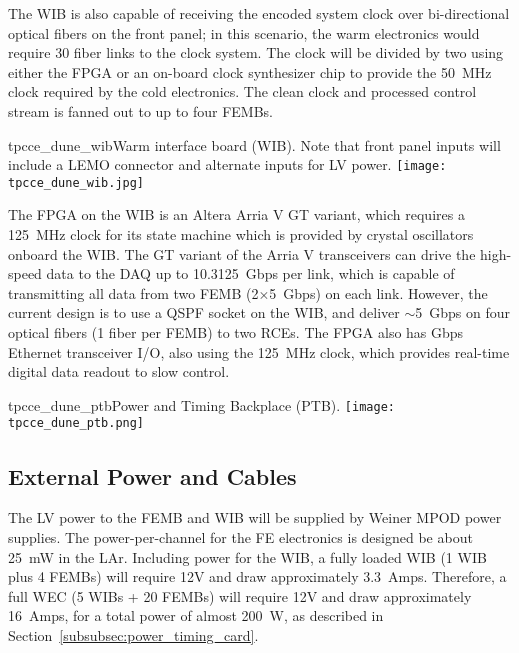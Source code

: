 The WIB is also capable of
receiving the encoded system clock over bi-directional optical
fibers on the front panel; in this scenario, the warm electronics would require 
30 fiber links to the clock system. The clock will be divided by two using either
the FPGA or an on-board clock synthesizer chip to provide the 50~MHz
clock required by the cold electronics.  The clean clock and processed
control stream is fanned out to up to four FEMBs.

\begin{cdrfigure}{tpcce_dune_wib}{Warm interface board (WIB). Note 
that front panel inputs will include a LEMO connector and alternate inputs for LV power.}
\texttt{[image: tpcce\_dune\_wib.jpg]}
\end{cdrfigure}

The FPGA on the WIB is an Altera Arria V GT variant, which requires a
125~MHz clock for its state machine which is provided by crystal
oscillators onboard the WIB. The GT variant of the Arria V
transceivers can drive the high-speed data to the DAQ up to
10.3125~Gbps per link, which is capable of transmitting all data from
two FEMB (2$\times$5~Gbps) on each link. However, the current design is to
use a QSPF socket on the WIB, and deliver $\sim$5~Gbps on four optical fibers 
(1 fiber per FEMB) to two RCEs. The FPGA also has Gbps Ethernet
transceiver I/O, also using the 125~MHz clock, which provides
real-time digital data readout to slow control.

\begin{cdrfigure}{tpcce_dune_ptb}{Power and Timing Backplace (PTB).}
\texttt{[image: tpcce\_dune\_ptb.png]}
\end{cdrfigure}


%
\subsection{External Power and Cables}
\label{subsec:ce_feedthrough_power}

The LV power to the FEMB and WIB will be supplied by Weiner MPOD power supplies. 
The power-per-channel for the FE electronics is designed be about 25~mW in the LAr.
Including power for the WIB, a fully loaded WIB (1 WIB plus 4 FEMBs) will require
12V and draw approximately 3.3~Amps. Therefore, a full WEC (5 WIBs + 20 FEMBs) will
require 12V and draw approximately 16~Amps, for a total power of almost 200~W, as 
described in Section~\ref{subsubsec:power_timing_card}.

